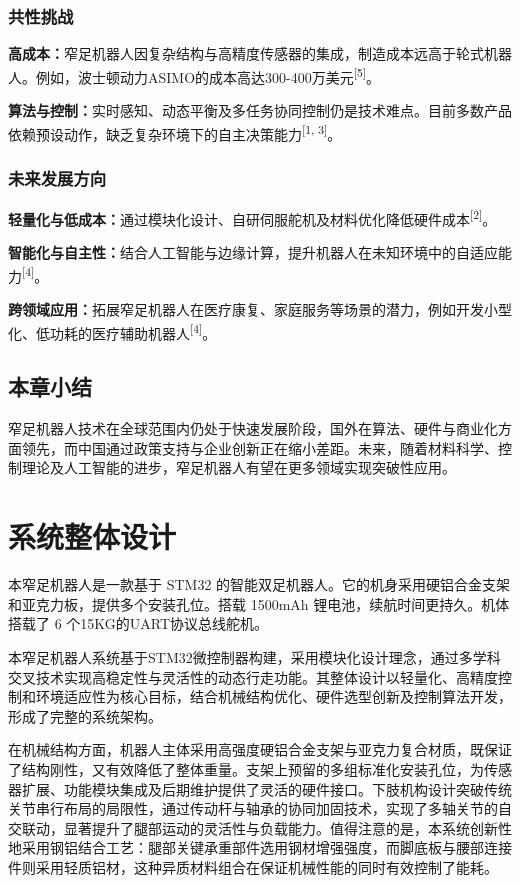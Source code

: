 \documentclass[a4paper,fontset=windows]{ctexart}
\begin{document}
\subsubsection{共性挑战}
\textbf{高成本：}窄足机器人因复杂结构与高精度传感器的集成，制造成本远高于轮式机器人。例如，波士顿动力ASIMO的成本高达300-400万美元\textsuperscript{[5]}。

\textbf{算法与控制：}实时感知、动态平衡及多任务协同控制仍是技术难点。目前多数产品依赖预设动作，缺乏复杂环境下的自主决策能力\textsuperscript{[1, 3]}。

\subsubsection{未来发展方向}
\textbf{轻量化与低成本：}通过模块化设计、自研伺服舵机及材料优化降低硬件成本\textsuperscript{[2]}。

\textbf{智能化与自主性：}结合人工智能与边缘计算，提升机器人在未知环境中的自适应能力\textsuperscript{[4]}。

\textbf{跨领域应用：}拓展窄足机器人在医疗康复、家庭服务等场景的潜力，例如开发小型化、低功耗的医疗辅助机器人\textsuperscript{[4]}。

\subsection{本章小结}
窄足机器人技术在全球范围内仍处于快速发展阶段，国外在算法、硬件与商业化方面领先，而中国通过政策支持与企业创新正在缩小差距。未来，随着材料科学、控制理论及人工智能的进步，窄足机器人有望在更多领域实现突破性应用。

\section{系统整体设计}

本窄足机器人是一款基于 STM32 的智能双足机器人。它的机身采用硬铝合金支架和亚克力板，提供多个安装孔位。搭载 1500mAh 锂电池，续航时间更持久。机体搭载了 6 个15KG的UART协议总线舵机。

本窄足机器人系统基于STM32微控制器构建，采用模块化设计理念，通过多学科交叉技术实现高稳定性与灵活性的动态行走功能。其整体设计以轻量化、高精度控制和环境适应性为核心目标，结合机械结构优化、硬件选型创新及控制算法开发，形成了完整的系统架构。

在机械结构方面，机器人主体采用高强度硬铝合金支架与亚克力复合材质，既保证了结构刚性，又有效降低了整体重量。支架上预留的多组标准化安装孔位，为传感器扩展、功能模块集成及后期维护提供了灵活的硬件接口。下肢机构设计突破传统关节串行布局的局限性，通过传动杆与轴承的协同加固技术，实现了多轴关节的自交联动，显著提升了腿部运动的灵活性与负载能力。值得注意的是，本系统创新性地采用钢铝结合工艺：腿部关键承重部件选用钢材增强强度，而脚底板与腰部连接件则采用轻质铝材，这种异质材料组合在保证机械性能的同时有效控制了能耗。
\end{document}
